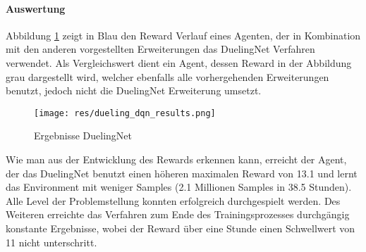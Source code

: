 \documentclass[11pt]{scrartcl}
\begin{document}
\paragraph*{Auswertung}
\noindent
\newline
Abbildung \ref{fig:dueling_dqn_results} zeigt in Blau den Reward Verlauf eines Agenten,
der in Kombination mit den anderen vorgestellten Erweiterungen das DuelingNet Verfahren
verwendet. Als Vergleichswert dient ein Agent, dessen Reward in der Abbildung grau
dargestellt wird, welcher ebenfalls alle vorhergehenden Erweiterungen benutzt, 
jedoch nicht die DuelingNet Erweiterung umsetzt.
\begin{figure}[htp]
  \centering
  \texttt{[image: res/dueling\_dqn\_results.png]}
  \caption{Ergebnisse DuelingNet}
  \label{fig:dueling_dqn_results}
\end{figure}
\noindent
Wie man aus der Entwicklung des Rewards erkennen kann, erreicht der Agent, der das
DuelingNet benutzt einen höheren maximalen Reward von 13.1 und lernt das Environment mit
weniger Samples (2.1 Millionen Samples in 38.5 Stunden). Alle Level der Problemstellung
konnten erfolgreich durchgespielt werden. Des Weiteren erreichte das Verfahren zum Ende
des Trainingsprozesses durchgängig konstante Ergebnisse, wobei der Reward über eine Stunde
einen Schwellwert von 11 nicht unterschritt.
\end{document}
